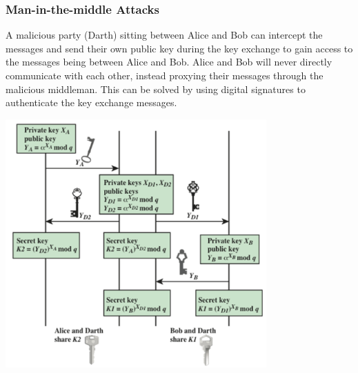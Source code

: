 \documentclass{math}
\begin{document}
\subsubsection*{Man-in-the-middle Attacks}
A malicious party (Darth) sitting between Alice and Bob can intercept the
messages and send their own public key during the key exchange to gain access
to the messages being between Alice and Bob. Alice and Bob will never directly
communicate with each other, instead proxying their messages through the
malicious middleman. This can be solved by using digital signatures to
authenticate the key exchange messages.
\begin{center}
  \includegraphics[width=10cm]{assets/diffie_hellman_mitm.png}
\end{center}
\end{document}
